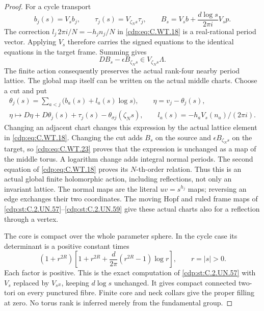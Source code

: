 \begin{proof}
For a cycle transport
\[
 b_j(s)=V_s b_j,\qquad
 \tau_j(s)=V_{\zeta_Ns}\tau_j,\qquad
 B_s=V_s b+\frac{d\log s}{2\pi i}V_s p .
 \tag{C.WT.22}\label{cdp:eq:C.WT.22}
\]
The correction
\(l_j\,2\pi i/N=-h_jn_j/N\)
in \eqref{cdp:eq:C.WT.18} is a real-rational
period vector. Applying \(V_s\)
therefore carries the signed
equations to the identical
equations in the target frame.
Summing gives
\[
                 D B_s-\epsilon B_{\zeta_Ns}
                               \in V_{\zeta_Ns}\Lambda .
 \tag{C.WT.23}\label{cdp:eq:C.WT.23}
\]
The finite action consequently
preserves the actual rank-four
nearby period lattice. The
global map itself can be
written on the actual middle
charts. Choose a cut and put
\[
 \begin{gathered}
 \theta_j(s)=\sum_{a<j}
      \bigl(b_a(s)+l_a(s)\log s\bigr),\qquad
 \eta=v_j-\theta_j(s),\\
 \eta\longmapsto
 D\eta+D\theta_j(s)+\tau_j(s)
                         -\theta_{\sigma j}(\zeta_Ns),
 \qquad l_a(s)=-h_aV_s(n_a)/(2\pi i).
 \end{gathered}
 \tag{C.WT.23a}\label{cdp:eq:C.WT.23a}
\]
Changing an adjacent chart
changes this expression by
the actual lattice element
in \eqref{cdp:eq:C.WT.18}. Changing the
cut adds \(B_s\) on the source
and \(\epsilon B_{\zeta_Ns}\)
on the target, so \eqref{cdp:eq:C.WT.23}
proves that the expression
is unchanged as a map of
the middle torus. A logarithm
change adds integral normal
periods. The second equation
of \eqref{cdp:eq:C.WT.18} proves its
\(N\)-th-order relation.
Thus this is an actual
global finite holomorphic
action, including reflections,
not only an invariant lattice.
The
normal maps are the literal
\(uv=s^{h_j}\) maps; reversing
an edge exchanges their two
coordinates. The moving
Hopf and ruled frame maps
of \ref{cdp:st:C.2.UN.57}--\ref{cdp:st:C.2.UN.59} give these
actual charts also for a
reflection through a vertex.

The core is compact over the
whole parameter sphere. In
the cycle case its determinant
is a positive constant times
\[
 (1+r^{2R})
 \left[1+r^{2R}
    +\frac d{2\pi}(r^{2R}-1)\log r\right],
                \qquad r=|s|>0 .
 \tag{C.WT.24}\label{cdp:eq:C.WT.24}
\]
Each factor is positive.
This is the exact computation
of \ref{cdp:st:C.2.UN.57} with \(V_s\) replaced
by \(V_{s^R}\), keeping
\(d\log s\) unchanged.
It gives compact connected
two-tori on every punctured
fibre. Finite core and neck
collars give the proper
filling at zero. No torus
rank is inferred merely
from the fundamental group.


\end{proof}
